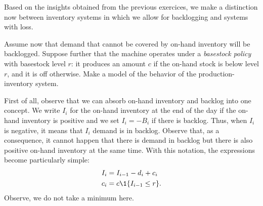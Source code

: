 Based on the insights obtained from the previous exercices, we make a distinction now between inventory systems in which we allow for backlogging  and systems  with loss.


\begin{exercise}
  Assume now that demand that cannot be covered by on-hand
  inventory will be  backlogged. Suppose further that  the machine operates under a \emph{basestock policy} with basestock level $r$: it produces an amount $c$ if the on-hand stock is below level $r$, and it is  off otherwise. Make a model of the behavior of the production-inventory system.
  \begin{solution}
    First of all, observe that we can absorb on-hand inventory and
    backlog into one concept. We write $I_i$ for the on-hand inventory
    at the end of the day if the on-hand inventory is positive and we
    set $I_i=-B_i$ if there is backlog. Thus, when $I_i$ is negative,
    it means that $I_i$ demand is in backlog.  Observe that, as a
    consequence, it cannot happen that there is demand in backlog but
    there is also positive on-hand inventory at the same time. With this notation, the expressions become particularly simple:
    \begin{align*}
      I_i &= I_{i-1}-d_i + c_i \\
c_i &= c \1{I_{i-1} \leq r}.
    \end{align*}
Observe, we do not take a minimum here.
  \end{solution}
\end{exercise}


